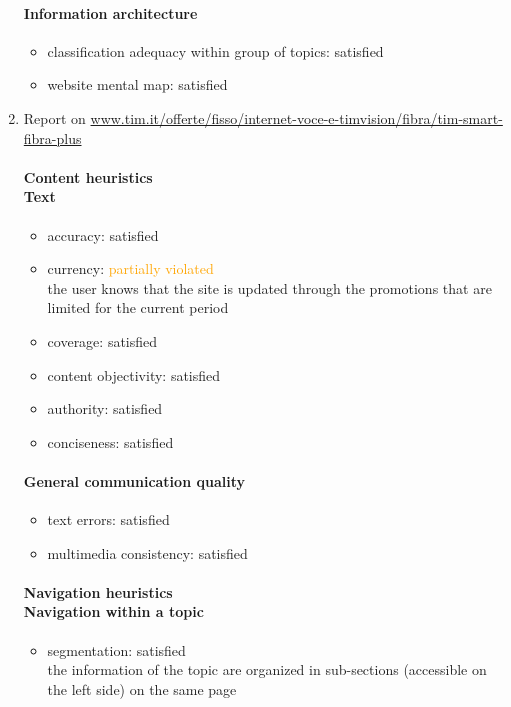 \begin{enumerate}
	\paragraph*{Information architecture}
	\begin{itemize}
		\item classification adequacy within group of topics: satisfied
		\item website mental map: satisfied
	\end{itemize}


\item Report on \url{www.tim.it/offerte/fisso/internet-voce-e-timvision/fibra/tim-smart-fibra-plus}
	\paragraph*{Content heuristics \\ Text}
	\begin{itemize}
		\item accuracy: satisfied
		\item currency:  \textcolor{orange}{partially violated}\\
		the user knows that the site is updated through the promotions that are limited for the current period
		\item coverage: satisfied
		\item content objectivity: satisfied
		\item authority: satisfied
		\item conciseness: satisfied		
	\end{itemize}

	\paragraph*{General communication quality}
	\begin{itemize}
		\item text errors: satisfied
		\item multimedia consistency: satisfied
	\end{itemize}

	\paragraph*{Navigation heuristics \\ Navigation within a topic}
	\begin{itemize}
		\item segmentation: satisfied\\
		the information of the topic are organized in sub-sections (accessible on the left side) on the same page
	\end{itemize}	


\end{enumerate}
